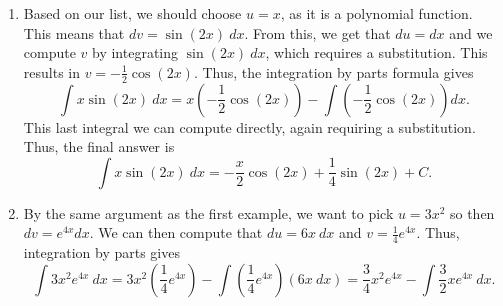 \begin{exampleSol}
\begin{enumerate}
\item Based on our list, we should choose $u = x$, as it is a polynomial function. This means that $dv = \sin(2x)\ dx$. From this, we get that $du = dx$ and we compute $v$ by integrating $\sin(2x)\ dx$, which requires a substitution. This results in $v = -\frac{1}{2}\cos(2x)$. Thus, the integration by parts formula gives
\[ \int x\sin(2x)\ dx = x \left(-\frac{1}{2}\cos(2x)\right) - \int \left(-\frac{1}{2}\cos(2x) \right) dx. \] This last integral we can compute directly, again requiring a substitution. Thus, the final answer is
\[ \int x\sin(2x)\ dx = -\frac{x}{2}\cos(2x) + \frac{1}{4}\sin(2x) + C. \]
\item By the same argument as the first example, we want to pick $u = 3x^2$ so then $dv = e^{4x} dx$. We can then compute that $du = 6x\ dx$ and $v = \frac{1}{4}e^{4x}$. Thus, integration by parts gives
\[ \int 3x^2e^{4x}\ dx = 3x^2\left(\frac{1}{4}e^{4x}\right) - \int \left(\frac{1}{4}e^{4x}\right) (6x \ dx) = \frac{3}{4}x^2e^{4x}- \int \frac{3}{2} xe^{4x}\ dx. \]


\end{enumerate}
\end{exampleSol}
